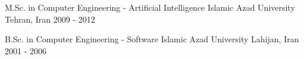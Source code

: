 

\begin{cventries}

  \cventry
    {M.Sc. in Computer Engineering - Artificial Intelligence} %
    {Islamic Azad University} %
    {Tehran, Iran} %
    {2009 - 2012} %
    {}

  \cventry
    {B.Sc. in Computer Engineering - Software} %
    {Islamic Azad University} %
    {Lahijan, Iran} %
    {2001 - 2006} %
    {}

\end{cventries}
